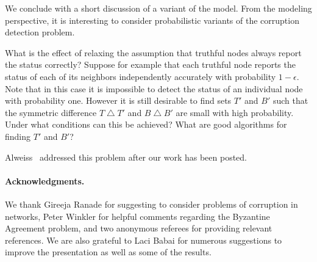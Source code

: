 \documentclass{toc}
\begin{document}
We conclude with a short discussion of a variant of the model. 
{}From the modeling perspective, it is interesting to consider 
probabilistic variants of the corruption detection problem. 
\begin{question}
What is the effect of relaxing the assumption that truthful nodes
always report the status correctly? Suppose for example that each
truthful node reports the status of each of its neighbors independently
accurately with probability $1-\epsilon$.  Note that in this case it is
impossible to detect the status of an individual node with probability
one. However it is still desirable to find sets $T'$ and $B'$ such that
the symmetric difference $T \bigtriangleup T'$ and $B \bigtriangleup B'$
are small with high probability. Under
what conditions can this be achieved? What are good algorithms for
finding $T'$ and $B'$?
\end{question} 

%
%
%
%
\begin{remark}
Alweiss~\cite{Alweiss:19} addressed this problem
after our work has been posted.
\end{remark}     %

\vspace{0.2cm}

%
%
\paragraph{Acknowledgments.}    %
We thank Gireeja Ranade for suggesting to consider
problems of corruption
%
in   %
networks, Peter Winkler for helpful
comments regarding the Byzantine Agreement problem, and two 
anonymous referees for providing relevant references. We are also 
grateful to Laci Babai for 
numerous suggestions to improve the presentation as well as some of
the results. 
%

%
%
%
%
%

%


   
%
%
%
%

\end{document}
